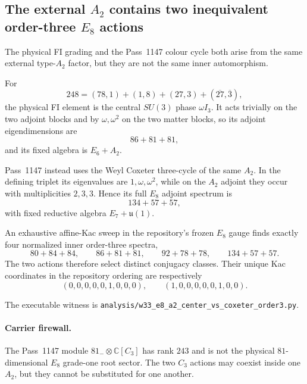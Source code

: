 \subsection*{The external $A_2$ contains two inequivalent order-three $E_8$ actions}

The physical FI grading and the Pass~1147 colour cycle both arise from the
same external type-$A_2$ factor, but they are not the same inner automorphism.

For
\[
248=(78,1)+(1,8)+(27,3)+(\overline{27},\overline3),
\]
the physical FI element is the central $SU(3)$ phase $\omega I_3$.  It acts
trivially on the two adjoint blocks and by $\omega,\omega^2$ on the two
matter blocks, so its adjoint eigendimensions are
\[
\boxed{86+81+81},
\]
and its fixed algebra is $E_6+A_2$.

Pass~1147 instead uses the Weyl Coxeter three-cycle of the same $A_2$.  In
the defining triplet its eigenvalues are $1,\omega,\omega^2$, while on the
$A_2$ adjoint they occur with multiplicities $2,3,3$.  Hence its full
$E_8$ adjoint spectrum is
\[
\boxed{134+57+57},
\]
with fixed reductive algebra $E_7+\mathfrak u(1)$.

An exhaustive affine-Kac sweep in the repository's frozen $E_8$ gauge finds
exactly four normalized inner order-three spectra,
\[
80+84+84,\qquad
86+81+81,\qquad
92+78+78,\qquad
134+57+57.
\]
The two actions therefore select distinct conjugacy classes.  Their unique
Kac coordinates in the repository ordering are respectively
\[
(0,0,0,0,0,1,0,0,0),
\qquad
(1,0,0,0,0,0,1,0,0).
\]

The executable witness is
\texttt{analysis/w33\_e8\_a2\_center\_vs\_coxeter\_order3.py}.

\paragraph{Carrier firewall.}
The Pass~1147 module $81_-\otimes\mathbb C[C_3]$ has rank $243$ and is not
the physical $81$-dimensional $E_8$ grade-one root sector.  The two $C_3$
actions may coexist inside one $A_2$, but they cannot be substituted for one
another.
